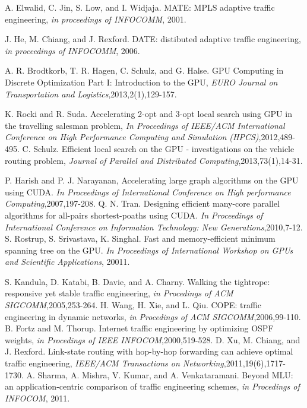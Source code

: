 \documentclass[master]{thesis-uestc}
\begin{document}
\begin{thebibliography}{1}
A. Elwalid, C. Jin, S. Low, and I. Widjaja. MATE: MPLS adaptive traffic engineering, \emph{in proceedings of INFOCOMM}, 2001.

J. He, M. Chiang, and J. Rexford. DATE: distibuted adaptive traffic engineering, \emph{in proceedings of INFOCOMM}, 2006.

A. R. Brodtkorb, T. R. Hagen, C. Schulz, and G. Halse. GPU Computing in Discrete Optimization Part I: Introduction to the GPU, \emph{EURO Journal on Transportation and Logistics},2013,2(1),129-157.

K. Rocki and R. Suda. Accelerating 2-opt and 3-opt local search using GPU in the travelling salesman problem, \emph{In Proceedings of IEEE/ACM International Conference on High Performance Computing
and Simulation (HPCS)},2012,489-495.
C. Schulz. Efficient local search on the GPU - investigations on the vehicle routing problem, \emph{Journal of Parallel and Distributed Computing},2013,73(1),14-31.

P. Harish and P. J. Narayanan, Accelerating large graph algorithms on the GPU using CUDA. \emph{In Proceedings of International Conference on High performance Computing},2007,197-208.
Q. N. Tran. Designing efficient many-core parallel algorithms for all-pairs shortest-poaths using CUDA. \emph{In Proceedings of International Conference on Information Technology: New Generations},2010,7-12.
S. Rostrup, S. Srivastava, K. Singhal. Fast and memory-efficient minimum spanning tree on the GPU. \emph{In Proceedings of International Workshop on GPUs and Scientific Applications}, 20011.


S. Kandula, D. Katabi, B. Davie, and A. Charny. Walking the tightrope: responsive yet stable traffic engineering, \emph{in Procedings of ACM SIGCOMM},2005,253-264.
H. Wang, H. Xie, and L. Qiu. COPE: traffic engineering in dynamic networks, \emph{in Procedings of ACM SIGCOMM},2006,99-110.
B. Fortz and M. Thorup. Internet traffic engineering by optimizing OSPF weights, \emph{in Procedings of IEEE INFOCOM},2000,519-528.
D. Xu, M. Chiang, and J. Rexford. Link-state routing with hop-by-hop forwarding can achieve optimal traffic engineering, \emph{IEEE/ACM Transactions on Networking},2011,19(6),1717-1730.
A. Sharma, A. Mishra, V. Kumar, and A. Venkataramani. Beyond MLU: an application-centric comparison of traffic engineering schemes, \emph{in Procedings of INFOCOM}, 2011.


\end{thebibliography}
\end{document}
